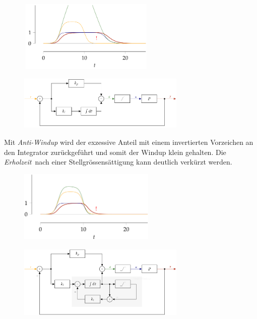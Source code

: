 \documentclass[
  10pt,
  a4paper,
]{article}
\numberwithin{equation}{section}
\begin{document}
\begin{multicols}{2}
\begin{figure}[H]

{\centering \includegraphics[width=6.5cm,height=3.4cm]{images/paste-27.png}

}

\end{figure}

\begin{figure}[H]

{\centering \includegraphics[width=8cm,height=2.6cm]{images/paste-28.png}

}

\end{figure}

Mit \emph{Anti-Windup} wird der exzessive Anteil mit einem invertierten
Vorzeichen an den Integrator zurückgeführt und somit der Windup klein
gehalten. Die \emph{Erholzeit}~nach einer Stellgrössensättigung kann
deutlich verkürzt werden.

\begin{figure}[H]

{\centering \includegraphics[width=6.5cm,height=\textheight]{images/paste-30.png}

}

\end{figure}

\begin{figure}[H]

{\centering \includegraphics[width=8cm,height=3.5cm]{images/paste-29.png}

}
\end{figure}
\end{multicols}
\end{document}
